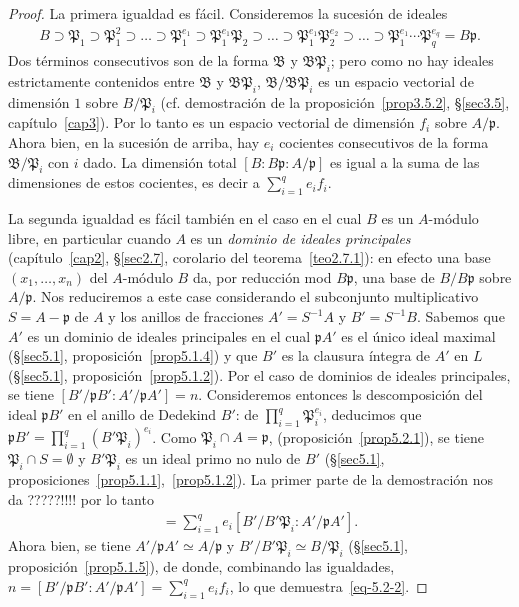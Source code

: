 \documentclass[oneside,bibtotoc,leqno,spanish]{amsbook}
\newcommand{\idl}[1]{\mathfrak{#1}}
\numberwithin{equation}{section}
\theoremstyle{defi}
\theoremstyle{note}
\theoremstyle{rem}
\numberwithin{theorem}{section}
\numberwithin{proposition}{section}
\numberwithin{definition}{section}
\numberwithin{lemma}{section}
\numberwithin{corollary}{section}
\numberwithin{example}{section}
\numberwithin{footnote}{section}%
\begin{document}
\begin{proof}
La primera igualdad es f\'acil. Consideremos la sucesi\'on de ideales
\begin{gather*}
B\supset\idl{P}_{1}\supset\idl{P}_{1}^{2}\supset\dots\supset\idl{P}_{1}^{e_{1}}\supset\idl{P}_{1}^{e_{1}}\idl{P}_{2}
\supset\dots\supset\idl{P}_{1}^{e_{1}}\idl{P}_{2}^{e_{2}}\supset\dots\supset\idl{P}_{1}^{e_{1}}\cdots\idl{P}_{q}^{e_{q}}
=B\idl{p}.
\end{gather*}
Dos t\'erminos consecutivos son de la forma $\idl{B}$ y $\idl{B}\idl{P}_{i}$; pero como no hay ideales estrictamente
contenidos entre $\idl{B}$ y $\idl{B}\idl{P}_{i}$, $\idl{B}/\idl{B}\idl{P}_{i}$ es un espacio vectorial de dimensi\'on
$1$ sobre $B/\idl{P}_{i}$ (cf. demostraci\'on de la proposici\'on~\ref{prop3.5.2}, \S\ref{sec3.5}, cap\'itulo~\ref{cap3}).
Por lo tanto es un
espacio vectorial de dimensi\'on $f_{i}$ sobre $A/\idl{p}$. Ahora bien, en la sucesi\'on de arriba, hay $e_{i}$
cocientes consecutivos de la forma $\idl{B}/\idl{P}_{i}$ con $i$ dado. La dimensi\'on total $[B:B\idl{p}:A/\idl{p}]$
es igual a la suma de las dimensiones de estos cocientes, es decir a $\sum_{i=1}^{q}e_{i}f_{i}$.

La segunda igualdad es f\'acil tambi\'en en el caso en el cual $B$ es un $A$-m\'odulo libre, en particular cuando
$A$ es un {\em dominio de ideales principales}
(cap\'itulo~\ref{cap2}, \S\ref{sec2.7}, corolario del teorema~\ref{teo2.7.1}): en efecto una
base $(x_{1},\dots,x_{n})$ del $A$-m\'odulo $B$ da, por reducci\'on mod $B\idl{p}$, una base de $B/B\idl{p}$ sobre
$A/\idl{p}$. Nos reduciremos a este case considerando el subconjunto multiplicativo $S = A-\idl{p}$ de $A$ y
los anillos de fracciones $A' = S^{-1}A$ y $B' = S^{-1}B$. Sabemos que $A'$ es un dominio de ideales principales
en el cual $\idl{p}A'$ es el \'unico ideal maximal (\S\ref{sec5.1}, proposici\'on~\ref{prop5.1.4}) y que $B'$ es la clausura \'integra de $A'$ en $L$
(\S\ref{sec5.1}, proposici\'on~\ref{prop5.1.2}). Por el caso de dominios de ideales principales, se tiene $[B'/\idl{p}B':A'/\idl{p}A']=n$.
Consideremos entonces ls descomposici\'on del ideal $\idl{p}B'$ en el anillo de Dedekind $B'$:
de $\prod_{i=1}^{q}\idl{P}_{i}^{e_{i}}$, deducimos que $\idl{p}B' = \prod_{i=1}^{q}(B'\idl{P}_{i})^{e_{i}}$. Como
$\idl{P}_{i}\cap A=\idl{p}$, (proposici\'on~\ref{prop5.2.1}), se tiene $\idl{P}_{i}\cap S = \emptyset$ y $B'\idl{P}_{i}$ es un ideal primo
no nulo de $B'$ (\S\ref{sec5.1}, proposiciones~\ref{prop5.1.1},~\ref{prop5.1.2}). La primer parte de la demostraci\'on nos da ?????!!!! por lo tanto
\begin{gather*}
[B'/\idl{p}B':A'/\idl{p}A']=\sum_{i=1}^{q}e_{i}[B'/B'\idl{P}_{i}:A'/\idl{p}A'].
\end{gather*}
Ahora bien, se tiene $A'/\idl{p}A'\simeq A/\idl{p}$ y $B'/B'\idl{P}_{i}\simeq B/\idl{P}_{i}$ (\S\ref{sec5.1},
proposici\'on~\ref{prop5.1.5}),
de donde, combinando las igualdades, $n=[B'/\idl{p}B':A'/\idl{p}A']=\sum_{i=1}^{q}e_{i}f_{i}$, lo que
demuestra~\eqref{eq-5.2-2}.
\end{proof}
\end{document}
